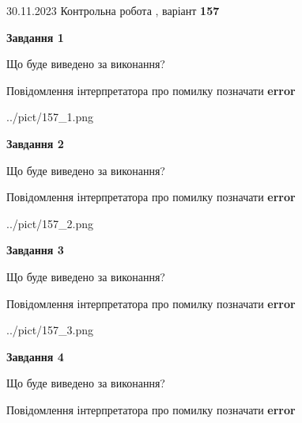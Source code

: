 \documentclass[12pt, ukrainian]{article}
\begin{document}
{{30.11.2023 Контрольна робота , варіант  \No \textbf { 157 }\par}}
{




{\begin {center}\textbf{Завдання 1}\end {center}}\par
Що буде виведено за виконання? \par
Повідомлення інтерпретатора про помилку позначати \textbf{error}

\begin{center}
	{../pict/157_1.png}
\end{center}
\newpage

{\begin {center}\textbf{Завдання 2}\end {center}}\par
Що буде виведено за виконання? \par
Повідомлення інтерпретатора про помилку позначати \textbf{error}

\begin{center}
	{../pict/157_2.png}
\end{center}
\newpage

{\begin {center}\textbf{Завдання 3}\end {center}}\par
Що буде виведено за виконання? \par
Повідомлення інтерпретатора про помилку позначати \textbf{error}

\begin{center}
	{../pict/157_3.png}
\end{center}
\newpage

{\begin {center}\textbf{Завдання 4}\end {center}}\par
Що буде виведено за виконання? \par
Повідомлення інтерпретатора про помилку позначати \textbf{error}

}
\end{document}
